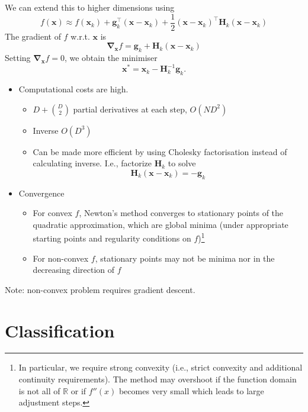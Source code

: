 \documentclass[11pt, %
	oneside, %
	english, %
	onehalfspacing, %
	parskip, %
	]{article} %
\theoremstyle{definition}
\begin{document}
We can extend this to higher dimensions using
\begin{equation*}
	f(\mathbf{x}) \approx f\left(\mathbf{x}_k\right)+\mathbf{g}_k^{\top}\left(\mathbf{x}-\mathbf{x}_k\right)+\frac{1}{2}\left(\mathbf{x}-\mathbf{x}_k\right)^{\top} \mathbf{H}_k\left(\mathbf{x}-\mathbf{x}_k\right)
\end{equation*}
The gradient of $f$ w.r.t. $\mathbf{x}$ is
$$
\boldsymbol{\nabla}_{\mathbf{x}} f=\mathbf{g}_k+\mathbf{H}_k\left(\mathbf{x}-\mathbf{x}_k\right)
$$
Setting $\boldsymbol{\nabla}_{\mathbf{x}} f=0$, we obtain the minimiser
$$
\mathbf{x}^*=\mathbf{x}_k-\mathbf{H}_k^{-1} \mathbf{g}_k.
$$

\begin{itemize}
	\item Computational costs are high.
	\begin{itemize}
		\item $D + \binom{D}{2}$ partial derivatives at each step, $O(ND^2)$
		\item Inverse $O(D^3)$
		\item Can be made more efficient by using Cholesky factorisation instead of calculating inverse. I.e., factorize $\mathbf{H}_k$ to solve
		\begin{equation*}
			\mathbf{H}_k\left(\mathbf{x}-\mathbf{x}_k\right)=-\mathbf{g}_k
		\end{equation*}
	\end{itemize}
	\item Convergence
	\begin{itemize}
		\item For convex $f$, Newton's method converges to stationary points of the quadratic approximation, which are global minima (under appropriate starting points and regularity conditions on $f$)\footnote{In particular, we require strong convexity (i.e., strict convexity and additional continuity requirements). The method may overshoot if the function domain is not all of $\mathbb{R}$ or if $f''(x)$ becomes very small which leads to large adjustment steps.}
		\item For non-convex $f$, stationary points may not be minima nor in the decreasing direction of $f$
	\end{itemize}
\end{itemize}
Note: non-convex problem requires gradient descent.



\section{Classification}
\end{document}
